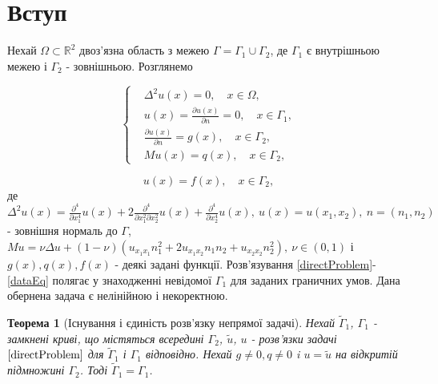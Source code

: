 \documentclass[12pt]{report}
\newtheorem{theorem}{Теорема}
\begin{document}
\tableofcontents


\chapter*{Вступ}
 
Нехай $\Omega\subset \mathbb{R}^2$ двоз'язна область з межею $\Gamma=\Gamma_1\cup\Gamma_2$, де $\Gamma_1$ є внутрішньою межею і $\Gamma_2$ - зовнішньою. Розглянемо

\begin{equation}
	\left\{
	\label{directProblem}
	\begin{split}
		&\Delta^2 u(x)=0, \quad x\in\Omega, \\
		&u(x)=\frac{\partial u(x)}{\partial n}=0, \quad x\in\Gamma_1, \\
		&\frac{\partial u(x)}{\partial n}=g(x), \quad x\in\Gamma_2, \\
		&Mu(x)=q(x), \quad x\in\Gamma_2,
	\end{split}
	\right.
\end{equation}

\begin{equation}
	\label{dataEq}
	u(x)=f(x), \quad x\in\Gamma_2,
\end{equation}
де $\Delta^{2}u(x)=\frac{\partial^{4}}{\partial x_1^4}u(x)+2\frac{\partial^{4}}{\partial x_1^2\partial x_2^2}u(x)+\frac{\partial^{4}}{\partial x_2^4}u(x),\ u(x)=u(x_1,x_2), \ n=(n_1, n_2)$ - зовнішня нормаль до $\Gamma$, $Mu=\nu\Delta u+(1-\nu)(u_{x_1 x_1}n_1^2+2u_{x_1 x_2}n_1 n_2+u_{x_2 x_2}n_2^2), \ \nu\in (0, 1)$ і $g(x),q(x),f(x)$ - деякі задані функції. Розв'язування \eqref{directProblem}-\eqref{dataEq} полягає у знаходженні невідомої $\Gamma_1$ для заданих граничних умов. Дана обернена задача є нелінійною і некоректною.

\begin{theorem}[Існування і єдиність розв'язку непрямої задачі]

Нехай $\tilde{\Gamma}_1$, $\Gamma_1$ - замкнені криві, що містяться всередині $\Gamma_2$, $\tilde{u}$, $u$ - розв'язки задачі $\eqref{directProblem}$ для $\tilde{\Gamma}_1$ і $\Gamma_1$ відповідно. Нехай $g\neq 0, q\neq 0$ i $u = \tilde{u}$ на відкритій підмножині $\Gamma_2$. Тоді $\tilde{\Gamma}_1=\Gamma_1$.

\end{theorem}
\end{document}
